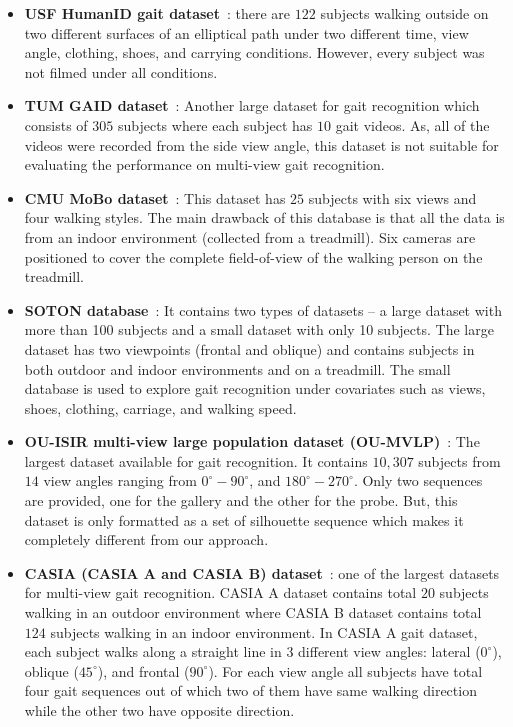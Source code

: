 \begin{itemize}
	\item \textbf{USF HumanID gait dataset}~\cite{Sarkar_05}: there are $ 122 $ subjects walking outside on two different surfaces of an elliptical path under two different time, view angle, clothing, shoes, and carrying conditions. However, every subject was not filmed under all conditions.
	
	\item \textbf{TUM GAID dataset}~\cite{Hofmann_14}: Another large dataset for gait recognition which consists of $ 305 $ subjects where each subject has $ 10 $ gait videos. As, all of the videos were recorded from the side view angle, this dataset is not suitable for evaluating the performance on multi-view gait recognition.
	
	\item \textbf{CMU MoBo dataset}~\cite{Gross_01}: This dataset has $25$ subjects with six views and four walking styles. The main drawback of this database is that all the data is from an indoor environment (collected from a treadmill). Six cameras are positioned to cover the complete field-of-view of the walking person on the treadmill.
	
	\item \textbf{SOTON database}~\cite{Shutler_04}: It contains two types of datasets – a large dataset with more than 100 subjects and a small dataset with only 10 subjects. The large dataset has two viewpoints (frontal and oblique) and contains subjects in both outdoor and indoor environments and on a treadmill. The small database is used to explore gait recognition under covariates such as views, shoes, clothing, carriage, and walking speed.
	
	\item \textbf{OU-ISIR multi-view large population dataset (OU-MVLP)}~\cite{Noriko_18}: The largest dataset available for gait recognition. It contains $ 10,307 $ subjects from $ 14 $ view angles ranging from ${{0}^{\circ}-{90}^{\circ}}$, and ${{180}^{\circ}-{270}^{\circ}}$. Only two sequences are provided, one for the gallery and the other for the probe. But, this dataset is only formatted as a set of silhouette sequence which makes it completely different from our approach.
	
	\item \textbf{CASIA (CASIA A and CASIA B) dataset}~\cite{Yu_06}: one of the largest datasets for multi-view gait recognition. CASIA A dataset contains total $ 20 $ subjects walking in an outdoor environment where CASIA B dataset contains total $ 124 $ subjects walking in an indoor environment. In CASIA A gait dataset, each subject walks along a straight line in 3 different view angles: lateral (${0^{\circ}}$), oblique (${45^{\circ}}$), and frontal (${90^{\circ}}$). For each view angle all subjects have total four gait sequences out of which two of them have same walking direction while the other two have opposite direction. 
	

\end{itemize}
